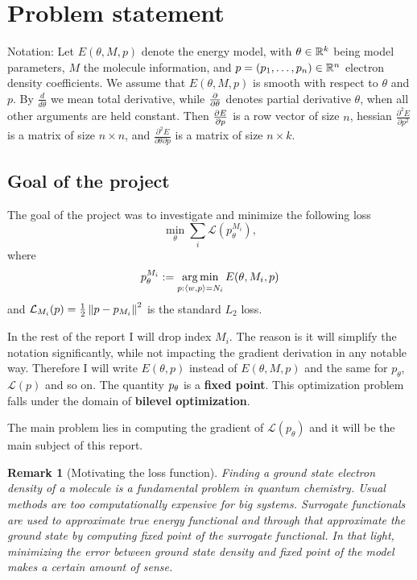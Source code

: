 \documentclass[a4paper,10pt]{report}
\newtheorem{remark}{Remark}
\begin{document}
\newpage

\section{Problem statement}
Notation: Let $E(\theta, M ,p)$ denote the energy model, with $\theta \in \mathbb{R}^k$ being model parameters, $M$ the molecule information, and $p=(p_1, \ldots ,p_n )\in \mathbb{R}^n$ electron density coefficients.  We assume that $E(\theta, M ,p)$ is smooth with respect to $\theta$ and $p$.
By $\frac{d}{d\theta}$ we mean total derivative, while $\frac{\partial }{\partial \theta}$ denotes partial derivative $\theta$, when all other arguments are held constant. Then $\frac{\partial E}{\partial p}$ is a row vector of size $n$, hessian $\frac{\partial^2 E}{ \partial p^2 }$ is a matrix of size $n \times n$, and $\frac{\partial^2 E}{\partial \theta \partial p}$ is a matrix of size $n \times k $.


\subsection{Goal of the project}
The goal of the project was to investigate and minimize the following loss
\begin{equation}\label{bilevel}
 \min_\theta \sum_i \mathcal{L}(p_{\theta}^{M_i}),
\end{equation}
where
\begin{equation}
  p_\theta^{M_i}:=\operatorname*{arg\,min}_{p : \langle w, p \rangle=N_i} E(\theta,M_i,p)
\end{equation}
and $\mathcal{L}_{M_i}(p) = \frac{1}{2}\left\|p-p_{M_i}\right\|^2$ is the standard $L_2$ loss.

In the rest of the report I will drop index $M_i$. The reason is it will simplify the notation significantly, while not impacting the gradient derivation in any notable way.
Therefore I will write $E(\theta,p)$ instead of $E(\theta,M,p)$ and the same for $p_\theta$, $\mathcal{L}(p)$ and so on.
The quantity $p_\theta$ is a \textbf{fixed point}.
This optimization problem falls under the domain of \textbf{bilevel optimization}.

The main problem lies in computing the gradient of $\mathcal{L}(p_\theta)$ and it will be the main subject of this report.

\begin{remark}[Motivating the loss function] Finding a ground state electron density of a molecule is a fundamental problem in quantum chemistry. Usual methods are too computationally expensive for big systems. Surrogate functionals are used to approximate true energy functional and through that approximate the ground state by computing fixed point of the surrogate functional. In that light, minimizing the error between ground state density and fixed point of the model makes a certain amount of sense.
\end{remark}
\end{document}
